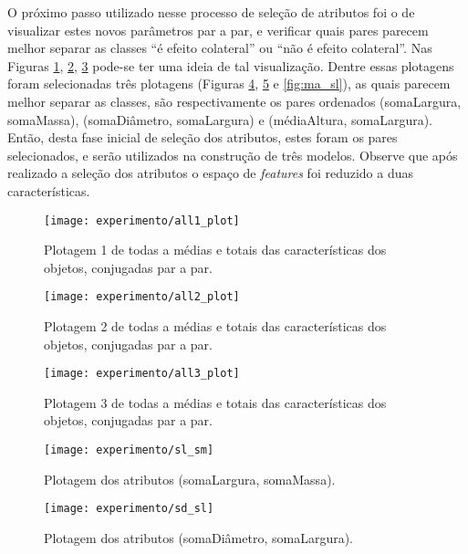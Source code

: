 O próximo passo utilizado nesse processo de seleção de atributos foi o de visualizar estes novos parâmetros par a par, e verificar quais pares parecem melhor separar as classes ``é efeito colateral'' ou ``não é efeito colateral''. Nas Figuras \ref{fig:plotall1}, \ref{fig:plotall2}, \ref{fig:plotall3} pode-se ter uma ideia de tal visualização. Dentre essas plotagens foram selecionadas três plotagens (Figuras \ref{fig:sl_sm}, \ref{fig:sd_sl} e \ref{fig:ma_sl}), as quais parecem melhor separar as classes, são respectivamente os pares ordenados (somaLargura, somaMassa), (somaDiâmetro, somaLargura) e (médiaAltura, somaLargura). Então, desta fase inicial de seleção dos atributos, estes foram os pares selecionados, e serão utilizados na construção de três modelos. Observe que após realizado a seleção dos atributos o espaço de \textit{features} foi reduzido a duas características.

\begin{figure}[!htb] \centering 
  \centering
  \texttt{[image: experimento/all1\_plot]} 
  \caption{Plotagem 1 de todas a médias e totais das características dos objetos, conjugadas par a par.} 
  \label{fig:plotall1}
\end{figure}

\begin{figure}[!htb] \centering 
  \centering
  \texttt{[image: experimento/all2\_plot]} 
  \caption{Plotagem 2 de todas a médias e totais das características dos objetos, conjugadas par a par.} 
  \label{fig:plotall2}
\end{figure}

\begin{figure}[!htb] \centering 
  \centering
  \texttt{[image: experimento/all3\_plot]} 
  \caption{Plotagem 3 de todas a médias e totais das características dos objetos, conjugadas par a par.} 
  \label{fig:plotall3}
\end{figure}

\begin{figure}[!htb] \centering 
  \centering
  \texttt{[image: experimento/sl\_sm]} 
  \caption{Plotagem dos atributos (somaLargura, somaMassa). } 
  \label{fig:sl_sm}
\end{figure}

\begin{figure}[!htb] \centering 
  \centering
  \texttt{[image: experimento/sd\_sl]} 
  \caption{Plotagem dos atributos (somaDiâmetro, somaLargura). } 
  \label{fig:sd_sl}
\end{figure}

